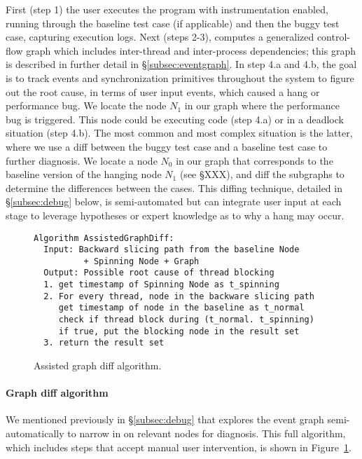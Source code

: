 First (step 1) the user executes the program with \xxx instrumentation enabled,
running through the baseline test case (if applicable) and then the buggy test
case, capturing execution logs. Next (steps 2-3), \xxx computes a generalized
control-flow graph which includes inter-thread and inter-process dependencies;
this graph is described in further detail in \S\ref{subsec:eventgraph}. In step
4.a and 4.b, the goal is to track events and synchronization primitives
throughout the system to figure out the root cause, in terms of user input
events, which caused a hang or performance bug. We locate the node $N_1$ in our
graph where the performance bug is triggered. This node could be executing code
(step 4.a) or in a deadlock situation (step 4.b). The most common and most
complex situation is the latter, where we use a diff between the buggy test
case and a baseline test case to further diagnosis. We locate a node $N_0$ in
our graph that corresponds to the baseline version of the hanging node $N_1$
(see \S XXX), and diff the subgraphs to determine the differences between the
cases. This diffing technique, detailed in \S\ref{subsec:debug} below, is
semi-automated but can integrate user input at each stage to leverage
hypotheses or expert knowledge as to why a hang may occur.

\begin{figure}[tb]
\footnotesize\begin{verbatim}
Algorithm AssistedGraphDiff:
  Input: Backward slicing path from the baseline Node
          + Spinning Node + Graph
  Output: Possible root cause of thread blocking
  1. get timestamp of Spinning Node as t_spinning
  2. For every thread, node in the backware slicing path
     get timestamp of node in the baseline as t_normal
     check if thread block during (t_normal. t_spinning)
     if true, put the blocking node in the result set
  3. return the result set
\end{verbatim}
    \caption{\xxx Assisted graph diff algorithm.}
    \label{fig:alg-graphdiff}
\end{figure}


\paragraph{Graph diff algorithm}
We mentioned previously in \S\ref{subsec:debug} that \xxx explores the event
graph semi-automatically to narrow in on relevant nodes for diagnosis. This
full algorithm, which includes steps that accept manual user intervention, is
shown in Figure~\ref{fig:alg-graphdiff}.

